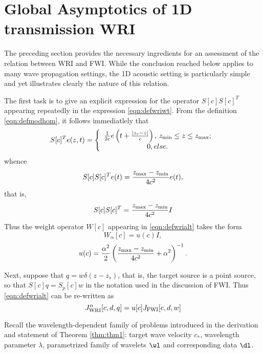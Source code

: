\section{Global Asymptotics of 1D transmission WRI}
The preceding section provides the necessary ingredients for an assessment of the relation between WRI and FWI. While the conclusion reached below applies to many wave propagation settings, the 1D acoustic setting is particularly simple and yet illustrates clearly the nature of this relation.

The first task is to give an explicit expression for the operator $S[c]S[c]^T$ appearing repeatedly in the expression \ref{eqn:defwriwt}. From the definition \ref{eqn:defmodhom}, it follows immediatlely that 
\begin{equation}
  \label{eqn:modhomtrans}
S[c]^Te(z,t)=
\left\{
    \begin{array}{c}
      \frac{1}{2c}e\left(t +  \frac{|z_r-z|}{c}\right), \,z_{\rm min} \le z \le z_{\rm max};\\
      0, else.
    \end{array}
  \right.
\end{equation}
whence
\[
  S[c]S[c]^Te(t) = \frac{z_{\rm max}-z_{\rm min}}{4c^2}e(t),
\]
that is,
\begin{equation}
  \label{eqn:modhomnormal}
  S[c]S[c]^T = \frac{z_{\rm max}-z_{\rm min}}{4c^2}I
\end{equation}
Thus the weight operator $W[c]$ appearing in \ref{eqn:defwrialt} takes
the form
\[
  W_{\alpha}[c] = u(c) I,
\]
\begin{equation}
  \label{eqn:wriwthom}
u(c) = \frac{\alpha^2}{2}\left(\frac{z_{\rm max}-z_{\rm min}}{4c^2}+\alpha^2\right)^{-1}.
\end{equation}

Next, suppose that $q = w\delta(z-z_s)$, that is, the target source is
a point source, so that $S[c]q = S_p[c]w$ in the notation used in
the discussion of FWI. Thus \ref{eqn:defwrialt} can be re-written as
\begin{equation}
  \label{eqn:wriscrewed}
  J_{\rm WRI}^{\alpha}[c,d,q]=u[c]J_{\rm FWI}[c,d,w]
\end{equation}

Recall the wavelength-dependent family of problems introduced in the derivation and
statement of Theorem \ref{thm:thm1}: target wave velocity $c_*$, wavelength parameter
$\lambda$, parametrized family of wavelets $\wl$ and corresponding
data $\dl$.

